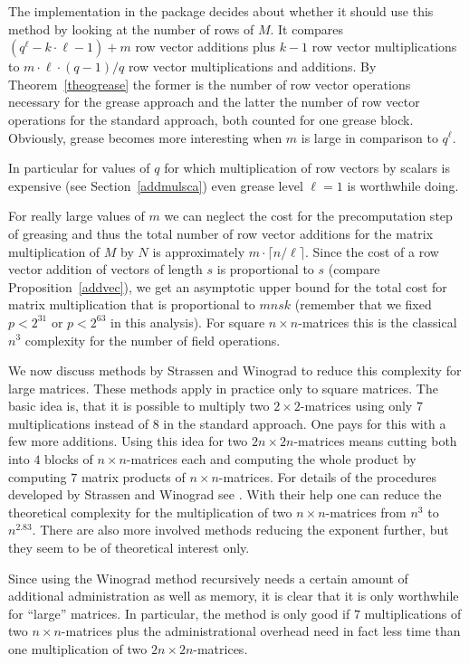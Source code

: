 The implementation in the {\cvec} package decides about whether it
should use this method by looking at the number of rows of $M$. It
compares $(q^\ell - k \cdot \ell - 1) + m$ 
row vector additions plus $k-1$ row vector multiplications to
$m \cdot \ell \cdot (q-1)/q$ row vector multiplications and additions.
By Theorem~\ref{theogrease} the former is the number of row vector
operations necessary for the grease approach and the latter the number
of row vector operations for the standard approach, both counted for
one grease block. Obviously, grease becomes more interesting when $m$ is
large in comparison to $q^\ell$.

In particular for values of $q$ for which multiplication of row vectors
by scalars is expensive (see Section~\ref{addmulsca}) even grease 
level $\ell = 1$ is worthwhile doing.

For really large values of $m$ we can neglect the cost for the
precomputation step of greasing and thus the total number of row 
vector additions for the matrix multiplication of $M$ by $N$ is
approximately $m \cdot \lceil n/\ell \rceil$. Since the cost of
a row vector addition of vectors of length $s$ is proportional
to $s$ (compare Proposition~\ref{addvec}), we get an asymptotic upper
bound for the total cost for matrix multiplication that is proportional
to $mnsk$ (remember that we fixed $p < 2^{31}$ or $p< 2^{63}$ in this
analysis). For square $n \times n$-matrices this is the classical
$n^3$ complexity for the number of field operations.

We now discuss methods by Strassen and Winograd to reduce this complexity
for large matrices. These methods apply in practice only to square matrices.
The basic idea is, that it is possible to multiply two $2 \times 2$-matrices
using only $7$ multiplications instead of $8$ in the standard approach.
One pays for this with a few more additions. Using this idea for two 
$2n \times 2n$-matrices means cutting both into $4$ blocks of 
$n\times n$-matrices each and computing the whole product by computing
$7$ matrix products of $n \times n$-matrices. For details of the
procedures developed by Strassen and Winograd see \cite[???]{AOCP}.
With their help one can reduce the theoretical complexity for the 
multiplication of two $n \times n$-matrices from $n^3$
to $n^{2.83}$. There are also more involved methods reducing the exponent
further, but they seem to be of theoretical interest only.

Since using the Winograd method recursively needs a certain amount of
additional administration as well as memory,
it is clear that it is only worthwhile for ``large'' matrices. In particular,
the method is only good if $7$ multiplications of two $n \times n$-matrices
plus the administrational overhead need in fact less time than one
multiplication of two $2n \times 2n$-matrices. 

